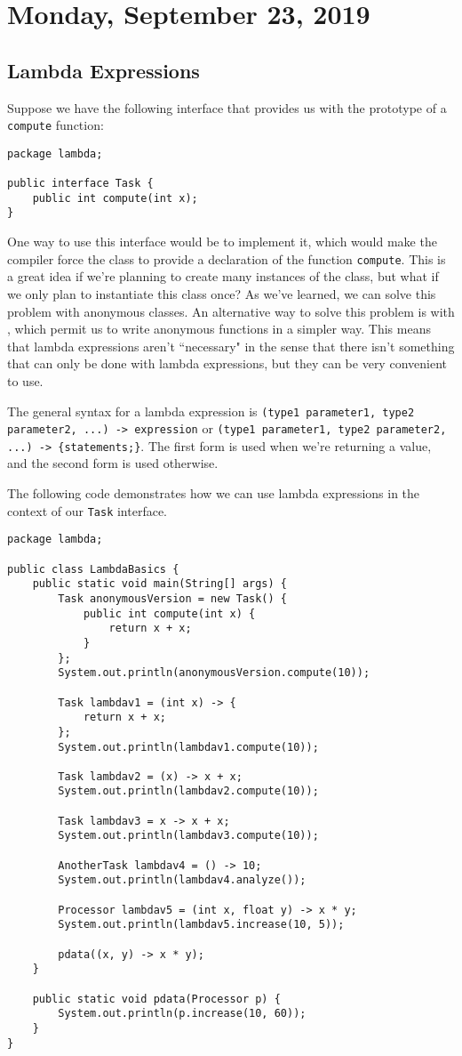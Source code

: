 \section{Monday, September 23, 2019}

\subsection{Lambda Expressions}
Suppose we have the following interface that provides us with the prototype of a \verb!compute! function:

\begin{lstlisting}
package lambda;

public interface Task {
	public int compute(int x);
}
\end{lstlisting}

One way to use this interface would be to implement it, which would make the compiler force the class to provide a declaration of the function \verb!compute!. This is a great idea if we're planning to create many instances of the class, but what if we only plan to instantiate this class once? As we've learned, we can solve this problem with anonymous classes. An alternative way to solve this problem is with , which permit us to write anonymous functions in a simpler way.  This means that lambda expressions aren't  ``necessary" in the sense that there isn't something that can only be done with lambda expressions, but they can be very convenient to use.

\noindent The general syntax for a lambda expression is \verb!(type1 parameter1, type2 parameter2, ...) -> expression! or \verb!(type1 parameter1, type2 parameter2, ...) -> {statements;}!. The first form is used when we're returning a value, and the second form is used otherwise. 

The following code demonstrates how we can use lambda expressions in the context of our \verb!Task! interface.

\begin{lstlisting}
package lambda;

public class LambdaBasics {
	public static void main(String[] args) {
		Task anonymousVersion = new Task() {
			public int compute(int x) {
				return x + x;
			}
		};
		System.out.println(anonymousVersion.compute(10));

		Task lambdav1 = (int x) -> {
			return x + x;
		};
		System.out.println(lambdav1.compute(10));

		Task lambdav2 = (x) -> x + x;
		System.out.println(lambdav2.compute(10));

		Task lambdav3 = x -> x + x;
		System.out.println(lambdav3.compute(10));

		AnotherTask lambdav4 = () -> 10;
		System.out.println(lambdav4.analyze());

		Processor lambdav5 = (int x, float y) -> x * y;
		System.out.println(lambdav5.increase(10, 5));

		pdata((x, y) -> x * y);
	}

	public static void pdata(Processor p) {
		System.out.println(p.increase(10, 60));
	}
}
\end{lstlisting}

